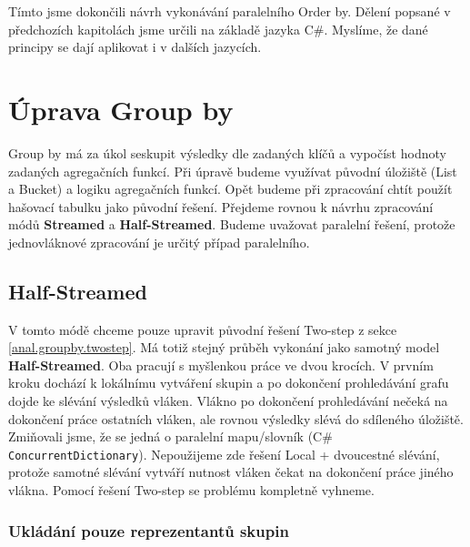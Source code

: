 Tímto jsme dokončili návrh vykonávání paralelního Order by.
Dělení popsané v předchozích kapitolách jsme určili na základě jazyka C\#.
Myslíme, že dané principy se dají aplikovat i v dalších jazycích.

\section{Úprava Group by} \label{anal.improvement.groupby}

Group by má za úkol seskupit výsledky dle zadaných klíčů a vypočíst hodnoty zadaných agregačních funkcí.
Při úpravě budeme využívat původní úložiště (List a Bucket) a logiku agregačních funkcí.
Opět budeme při zpracování chtít použít hašovací tabulku jako původní řešení.
Přejdeme rovnou k návrhu zpracování módů \textbf{Streamed} a \textbf{Half-Streamed}.
Budeme uvažovat paralelní řešení, protože jednovláknové zpracování je určitý případ paralelního.

\subsection{Half-Streamed} 

V tomto módě chceme pouze upravit původní řešení Two-step z sekce \ref{anal.groupby.twostep}.
Má totiž stejný průběh vykonání jako samotný model \textbf{Half-Streamed}.
Oba pracují s myšlenkou práce ve dvou krocích.
V prvním kroku dochází k lokálnímu vytváření skupin a po dokončení prohledávání grafu dojde ke slévání výsledků vláken.
Vlákno po dokončení prohledávání nečeká na dokončení práce ostatních vláken, ale rovnou výsledky slévá do sdíleného úložiště.
Zmiňovali jsme, že se jedná o paralelní mapu/slovník (C\# \texttt{ConcurrentDictionary}).
Nepoužijeme zde řešení Local + dvoucestné slévání, protože samotné slévání vytváří nutnost vláken čekat na dokončení práce jiného vlákna.
Pomocí řešení Two-step se problému kompletně vyhneme.

\subsubsection{Ukládání pouze reprezentantů skupin} \label{anal.uprava.Groupby.table}

